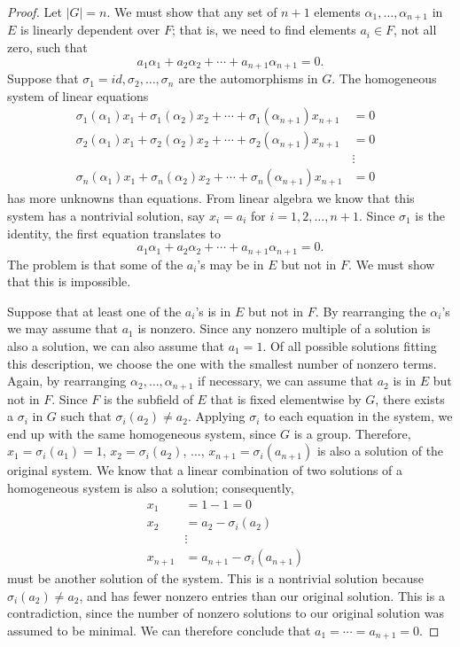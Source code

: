  
\begin{proof}
Let $|G| = n$. We must show that any set of $n+1$ elements $\alpha_1,
\ldots, \alpha_{n+1}$ in $E$ is linearly dependent over $F$; that is,
we need to find elements $a_i \in F$, not all zero, such that 
\[
a_1 \alpha_1 + a_2 \alpha_2 + \cdots + a_{n+1} \alpha_{n+1} = 0.
\]
Suppose that $\sigma_1 = id, \sigma_2, \ldots, \sigma_n$ are the
automorphisms in $G$. The homogeneous system of linear
equations 
\begin{align*}
\sigma_1( \alpha_1 ) x_1 + \sigma_1(\alpha_2) x_2 + \cdots +
\sigma_1(\alpha_{n+1} ) x_{n+1} & = 0 \\
\sigma_2( \alpha_1 ) x_1 + \sigma_2(\alpha_2) x_2 + \cdots +
\sigma_2(\alpha_{n+1} ) x_{n+1} & = 0 \\
& \vdots & \\
\sigma_n( \alpha_1 ) x_1 + \sigma_n(\alpha_2) x_2 + \cdots +
\sigma_n(\alpha_{n+1} ) x_{n+1} & = 0
\end{align*}
has more unknowns than equations. From linear algebra we know that
this system has a nontrivial solution, say $x_i = a_i$ for $i = 1, 2,
\ldots, n+1$. Since $\sigma_1$ is the identity, the first equation
translates to
\[
a_1 \alpha_1 +  a_2 \alpha_2  + \cdots + a_{n+1} \alpha_{n+1} = 0.
\]
The problem is that some of the $a_i$'s may be in $E$ but not in $F$. 
We must show that this is impossible.
 
 
Suppose that at least one of the $a_i$'s is in $E$ but not in $F$. By
rearranging the $\alpha_i$'s we may assume that $a_1$ is nonzero.
Since any nonzero multiple of a solution is also a solution, we can
also assume that $a_1 = 1$. Of all possible solutions fitting this
description, we choose the one with the smallest number of nonzero terms.
Again, by rearranging $\alpha_2, \ldots, \alpha_{n+1}$ if necessary,
we can assume that $a_2$ is in $E$ but not in $F$. Since $F$ is the
subfield of $E$ that is fixed elementwise by $G$, there exists a
$\sigma_i$ in $G$ such that $\sigma_i( a_2 ) \neq a_2$. Applying
$\sigma_i$ to each equation in the system, we end up with the same
homogeneous system, since $G$ is a group. Therefore, $x_1 =
\sigma_i(a_1) = 1$, $x_2 = \sigma_i(a_2)$, $\ldots$, $x_{n+1} =
\sigma_i(a_{n+1} )$ is also a solution of the original system. We know
that a linear combination of two solutions of a homogeneous system is
also a solution; consequently,   
\begin{align*}
x_1 & = 1 -1 = 0 \\
x_2 & = a_2 - \sigma_i(a_2) \\
& \vdots & \\
x_{n+1} & = a_{n+1} - \sigma_i(a_{n+1}) 
\end{align*}
must be another solution of the system. This is a nontrivial solution
because $\sigma_i( a_2 ) \neq a_2$, and has fewer nonzero entries than
our original solution. This is a contradiction, since the number of
nonzero solutions to our original solution was assumed to be minimal.
We can therefore conclude that $a_1 = \cdots = a_{n+1} = 0$.
\end{proof}
 
